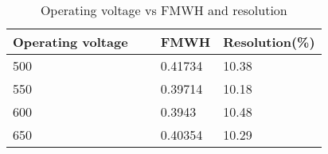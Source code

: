 \begin{table}[H]
    \centering
    \begin{tabular}{|l|l|l|l|}
    \hline
        Operating voltage & ~ & FMWH & Resolution(\%) \\ \hline
        500 & ~ & 0.41734 & 10.38 \\ \hline
        550 & ~ & 0.39714 & 10.18 \\ \hline
        600 & ~ & 0.3943 & 10.48 \\ \hline
        650 & ~ & 0.40354 & 10.29 \\ \hline
    \end{tabular}
    \caption{Operating voltage vs FMWH and resolution}
    \label{tab:resolution}
\end{table}